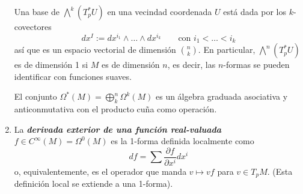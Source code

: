 \documentclass[spanish]{article}
\theoremstyle{definition}
\newcommand{\R}{\mathbb{R}}
\newcommand{\Cinf}{C^\infty}
\begin{document}
\begin{enumerate}
		Una base de $\bigwedge^k(T_p^*U)$ en una vecindad coordenada $U$ está dada por los $k$-covectores
		\[dx^I:=dx^{i_1}\wedge\ldots\wedge dx^{i_k}\qquad \text{con }i_1<\ldots<i_k\]
		así que es un espacio vectorial de dimensión $\binom{n}{k}$. En particular, $\bigwedge^n(T_p^*U)$ es de dimensión 1 si $M$ es de dimensión $n$, es decir, las $n$-formas se pueden identificar con funciones suaves.
		\iffalse
		Conviene pensar en estos objetos , para los 1-covectores $\omega^1,\ldots,\omega^k$ y los vectores $v_1,\ldots,v_k$,
		\[\omega^1\wedge\ldots\wedge\omega^k(v_1,\ldots,v_k)=\det(\omega^i(v_j))\]
		Por ejemplo, en $\R^2$, $dx\wedge dy\left(\begin{pmatrix}
			v^1\\
			v^2
		\end{pmatrix},\begin{pmatrix}
			w^1\\
			w^2
		\end{pmatrix}\right)=v^1w^2-v^2w^1$.\fi
		
		El conjunto $\Omega^*(M)=\bigoplus_k^n\Omega^k(M)$ es un álgebra graduada asociativa y anticonmutativa con el producto cuña como operación.
		
		
		\item La \textbf{\textit{derivada exterior de una función real-valuada}} $f\in\Cinf(M)=\Omega^0(M)$ es la 1-forma definida localmente como
		\[df=\sum\frac{\partial f}{\partial x^i}dx^i\]
		o, equivalentemente, es el operador que manda $v\mapsto vf$ para $v\in T_pM$. (Esta definición local se extiende a una 1-forma).
		

\end{enumerate}
\end{document}
